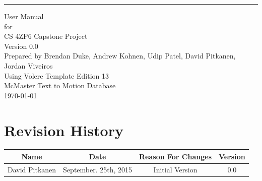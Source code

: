 \documentclass{scrreprt}
\date{}
\def\myversion{0.0 }
\begin{document}
\begin{flushright}
    \rule{16cm}{5pt}\vskip1cm
    \begin{bfseries}
        \Huge{User Manual }\\
        \vspace{1.4cm}
        for\\
        \vspace{1.4cm}
        CS 4ZP6 Capstone Project\\
        \vspace{1.4cm}
        \LARGE{Version \myversion}\\
        \vspace{1.4cm}
        Prepared by Brendan Duke, Andrew Kohnen, Udip Patel, David Pitkanen, Jordan Viveiros\\
        \vspace{1.4cm}
        Using Volere Template Edition 13\\
        \vspace{1.4cm}
        McMaster Text to Motion Database\\
        \vspace{1.4cm}
        \today\\
    \end{bfseries}
\end{flushright}

\listoffigures


\tableofcontents

\chapter*{Revision History}

\begin{center}
    \begin{tabular}{|c|c|c|c|}
        \hline
            Name & Date & Reason For Changes & Version\\
        \hline
	    David Pitkanen & September. 25th, 2015 & Initial Version & 0.0\\
        \hline
    \end{tabular}
\end{center}

\end{document}
